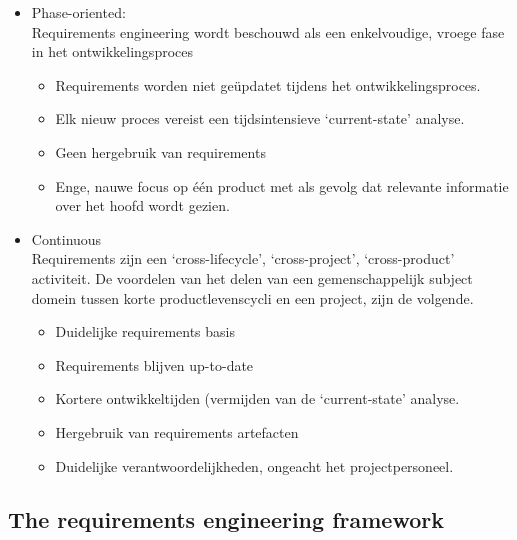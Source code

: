 \documentclass{article}
\begin{document}
\begin{itemize}
	\item Phase-oriented: \\
Requirements engineering wordt beschouwd als een enkelvoudige, vroege fase in het ontwikkelingsproces
\begin{itemize}
 \item Requirements worden niet ge\"updatet tijdens het ontwikkelingsproces.
 \item Elk nieuw proces vereist een tijdsintensieve `current-state' analyse.
 \item Geen hergebruik van requirements
 \item Enge, nauwe focus op \'e\'en product met als gevolg dat relevante informatie over het hoofd wordt gezien.
 \end{itemize}
	\item Continuous \\
	Requirements zijn een `cross-lifecycle', `cross-project', `cross-product' activiteit. De voordelen van het delen van een gemenschappelijk subject domein tussen korte productlevenscycli en een project, zijn de volgende.
	\begin{itemize}
	\item Duidelijke requirements basis
	\item Requirements blijven up-to-date
	\item Kortere ontwikkeltijden (vermijden van de `current-state' analyse.
	\item Hergebruik van requirements artefacten
	\item Duidelijke verantwoordelijkheden, ongeacht het projectpersoneel.
	\end{itemize}
\end{itemize}

\subsection{The requirements engineering framework}
\end{document}

